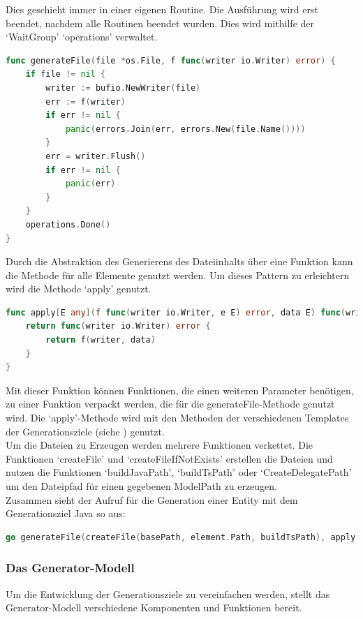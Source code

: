 \documentclass[./einleitung.tex]{subfiles}
\begin{document}
    Dies geschieht immer in einer eigenen Routine.
    Die Ausführung wird erst beendet, nachdem alle Routinen beendet wurden.
    Dies wird mithilfe der `WaitGroup' `operations' verwaltet.
    \begin{lstlisting}[language=Go, caption=Die Methode generateFile, label=lst:generateFile]
func generateFile(file *os.File, f func(writer io.Writer) error) {
	if file != nil {
		writer := bufio.NewWriter(file)
		err := f(writer)
		if err != nil {
			panic(errors.Join(err, errors.New(file.Name())))
		}
		err = writer.Flush()
		if err != nil {
			panic(err)
		}
	}
	operations.Done()
}
    \end{lstlisting}
    Durch die Abstraktion des Generierens des Dateiinhalts über eine Funktion kann die Methode für alle Elemente genutzt werden.
    Um dieses Pattern zu erleichtern wird die Methode `apply' genutzt.
    \begin{lstlisting}[language=Go, caption=Die apply-Methode, label=lst:apply]
func apply[E any](f func(writer io.Writer, e E) error, data E) func(writer io.Writer) error {
	return func(writer io.Writer) error {
		return f(writer, data)
	}
}
    \end{lstlisting}
    Mit dieser Funktion können Funktionen, die einen weiteren Parameter benötigen, zu einer Funktion verpackt werden, die für die generateFile-Methode genutzt wird.
    Die `apply'-Methode wird mit den Methoden der verschiedenen Templates der Generationsziele (siehe ) genutzt.\\

    Um die Dateien zu Erzeugen werden mehrere Funktionen verkettet.
    Die Funktionen `createFile' und `createFileIfNotExists' erstellen die Dateien und nutzen die Funktionen `buildJavaPath', `buildTsPath' oder `CreateDelegatePath' um den Dateipfad für einen gegebenen ModelPath zu erzeugen.\\
    Zusammen sieht der Aufruf für die Generation einer Entity mit dem Generationsziel Java so aus:
    \begin{lstlisting}[language=Go, caption=Generation einer Entity, label=lst:generateEntity]
go generateFile(createFile(basePath, element.Path, buildTsPath), apply(template.GenerateEntity, element))
    \end{lstlisting}

    \subsubsection{Das Generator-Modell}\label{subsubsec:generator-modell}
    Um die Entwicklung der Generationsziele zu vereinfachen werden, stellt das Generator-Modell verschiedene Komponenten und Funktionen bereit.
\end{document}

